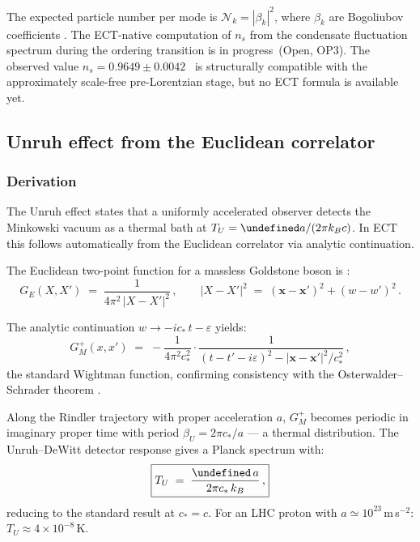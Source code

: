 \documentclass[11pt,a4paper]{article}
\let\hbar\undefined
\numberwithin{equation}{section}
\begin{document}
The expected particle number per mode is
$\mathcal{N}_k = |\beta_k|^2$,
where $\beta_k$ are Bogoliubov coefficients \cite{BirrellDavies1982}.
The ECT-native computation of $n_s$ from the condensate
fluctuation spectrum during the ordering transition is in progress~(Open, OP3).
The observed value $n_s = 0.9649 \pm 0.0042$~\cite{Planck2018} is
structurally compatible with the approximately scale-free
pre-Lorentzian stage, but no ECT formula is available yet.
\label{eq:ns_cosm}

\subsection{Unruh effect from the Euclidean correlator}


\subsubsection{Derivation}

The Unruh effect \cite{Unruh1976,Fulling1973,Davies1975} states that a
uniformly accelerated observer detects the Minkowski vacuum as a thermal
bath at $T_U = \hbar a/(2\pi k_B c)$.  In ECT this follows automatically
from the Euclidean correlator via analytic continuation.

The Euclidean two-point function for a massless Goldstone boson is
\cite{BirrellDavies1982}:
\begin{equation}
  G_E(X,X')
  \;=\;
  \frac{1}{4\pi^2\,|X-X'|^2}\,,
  \qquad
  |X-X'|^2 \;=\; (\boldsymbol{x}-\boldsymbol{x}')^2 + (w-w')^2\,.
  \label{eq:green_euclidean}
\end{equation}

The analytic continuation $w\to -ic_*\,t - \varepsilon$ yields:
\begin{equation}
  G^+_M(x,x')
  \;=\;
  -\frac{1}{4\pi^2 c_*^2}
  \cdot
  \frac{1}{(t-t'-i\varepsilon)^2 - |\boldsymbol{x}-\boldsymbol{x}'|^2/c_*^2}\,,
  \label{eq:wightman}
\end{equation}
the standard Wightman function, confirming consistency with the
Osterwalder--Schrader theorem \cite{OsterwalderSchrader1973}.

Along the Rindler trajectory with proper acceleration $a$,
$G^+_M$ becomes periodic in imaginary proper time with period
$\beta_U = 2\pi c_*/a$ --- a thermal distribution.
The Unruh--DeWitt detector response gives a Planck spectrum with:
\begin{equation}
  \boxed{%
    T_U \;=\; \frac{\hbar\,a}{2\pi c_*\,k_B}\,,
  }
  \label{eq:unruh_ect}
\end{equation}
reducing to the standard result at $c_*=c$.
For an LHC proton with $a\simeq10^{23}$\,m\,s$^{-2}$:
$T_U\approx4\times10^{-8}$\,K.
\end{document}
